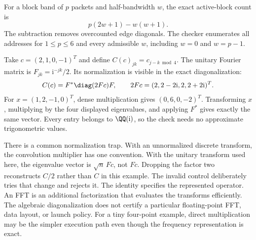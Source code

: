 For a block band of $p$ packets and half-bandwidth $w$, the exact active-block count is
\[
p(2w+1)-w(w+1).
\]
The subtraction removes overcounted edge diagonals. The checker enumerates all addresses for $1\le p\le6$ and every admissible $w$, including $w=0$ and $w=p-1$.

Take $c=(2,1,0,-1)^T$ and define $C(c)_{jk}=c_{j-k\bmod4}$. The unitary Fourier matrix is $F_{jk}=\mathrm i^{-jk}/2$. Its normalization is visible in the exact diagonalization:
\[
C(c)=F^*\diag(2Fc)F,\qquad 2Fc=(2,2-2\mathrm i,2,2+2\mathrm i)^T.
\]
For $x=(1,2,-1,0)^T$, dense multiplication gives $(0,6,0,-2)^T$. Transforming $x$, multiplying by the four displayed eigenvalues, and applying $F^*$ gives exactly the same vector. Every entry belongs to $\QQ(\mathrm i)$, so the check needs no approximate trigonometric values.

There is a common normalization trap. With an unnormalized discrete transform, the convolution multiplier has one convention. With the unitary transform used here, the eigenvalue vector is $\sqrt n\,Fc$, not $Fc$. Dropping the factor two reconstructs $C/2$ rather than $C$ in this example. The invalid control deliberately tries that change and rejects it.
The identity specifies the represented operator. An FFT is an additional factorization that evaluates the transforms efficiently. The algebraic diagonalization does not certify a particular floating-point FFT, data layout, or launch policy. For a tiny four-point example, direct multiplication may be the simpler execution path even though the frequency representation is exact.

